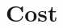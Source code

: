 \documentclass[oneside,11pt]{amsart}
\begin{document}

\section{Cost}
\label{sec:cost}



\newpage

\begin{multicols}{2}
\scriptsize


\end{multicols}
\end{document}
